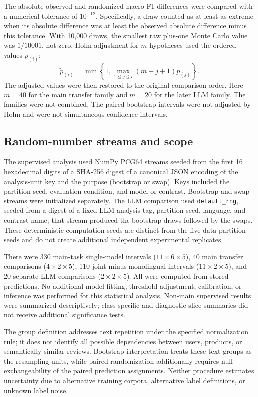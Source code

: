 The absolute observed and randomized macro-F1 differences were compared with a numerical tolerance of $10^{-12}$. Specifically, a draw counted as at least as extreme when its absolute difference was at least the observed absolute difference minus this tolerance. With 10,000 draws, the smallest raw plus-one Monte Carlo value was $1/10001$, not zero. Holm adjustment for $m$ hypotheses used the ordered values $p_{(i)}$:
\[
 \widetilde{p}_{(i)}=
 \min\left\{1,\max_{1\leq j\leq i}(m-j+1)p_{(j)}\right\}.
\]
The adjusted values were then restored to the original comparison order. Here $m=40$ for the main transfer family and $m=20$ for the later LLM family. The families were not combined. The paired bootstrap intervals were not adjusted by Holm and were not simultaneous confidence intervals.

\subsection{Random-number streams and scope}
The supervised analysis used NumPy PCG64 streams seeded from the first 16 hexadecimal digits of a SHA-256 digest of a canonical JSON encoding of the analysis-unit key and the purpose (bootstrap or swap). Keys included the partition seed, evaluation condition, and model or contrast. Bootstrap and swap streams were initialized separately. The LLM comparison used \texttt{default\_rng}, seeded from a digest of a fixed LLM-analysis tag, partition seed, language, and contrast name; that stream produced the bootstrap draws followed by the swaps. These deterministic computation seeds are distinct from the five data-partition seeds and do not create additional independent experimental replicates.

There were 330 main-task single-model intervals ($11\times6\times5$), 40 main transfer comparisons ($4\times2\times5$), 110 joint-minus-monolingual intervals ($11\times2\times5$), and 20 separate LLM comparisons ($2\times2\times5$). All were computed from stored predictions. No additional model fitting, threshold adjustment, calibration, or inference was performed for this statistical analysis. Non-main supervised results were summarized descriptively; class-specific and diagnostic-slice summaries did not receive additional significance tests.

The group definition addresses text repetition under the specified normalization rule; it does not identify all possible dependencies between users, products, or semantically similar reviews. Bootstrap interpretation treats these text groups as the resampling units, while paired randomization additionally requires null exchangeability of the paired prediction assignments. Neither procedure estimates uncertainty due to alternative training corpora, alternative label definitions, or unknown label noise.

